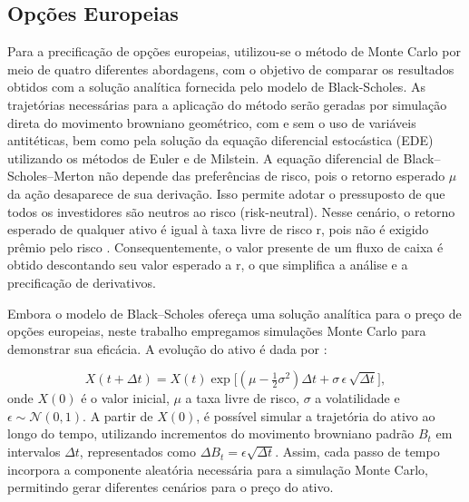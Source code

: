 \documentclass[12pt,openright,oneside,a4paper]{abntex2}
\numberwithin{equation}{section}
\begin{document}

\subsection{Opções Europeias}

Para a precificação de opções europeias, utilizou-se o método de Monte Carlo por meio de quatro diferentes abordagens, com o objetivo de comparar os resultados obtidos com a solução analítica fornecida pelo modelo de Black-Scholes. As trajetórias necessárias para a aplicação do método serão geradas por simulação direta do movimento browniano geométrico, com e sem o uso de variáveis antitéticas, bem como pela solução da equação diferencial estocástica (EDE) utilizando os métodos de Euler e de Milstein. A equação diferencial de Black--Scholes--Merton não depende das preferências de risco, pois o retorno esperado $\mu$ da ação desaparece de sua derivação. Isso permite adotar o pressuposto de que todos os investidores são neutros ao risco (risk-neutral). Nesse cenário, o retorno esperado de qualquer ativo é igual à taxa livre de risco r, pois não é exigido prêmio pelo risco \textcite[p.~357]{Hull}. Consequentemente, o valor presente de um fluxo de caixa é obtido descontando seu valor esperado a r, o que simplifica a análise e a precificação de derivativos.

Embora o modelo de Black--Scholes ofereça uma solução analítica para o preço de opções europeias, neste trabalho empregamos simulações Monte Carlo para demonstrar sua eficácia. A evolução do ativo é dada por \textcite[p.~508]{Hull}:

\begin{equation}
X(t + \Delta t) = X(t) \exp \Big[ (\mu - \tfrac{1}{2}\sigma^2) \Delta t + \sigma \, \epsilon \, \sqrt{\Delta t} \Big],
\end{equation}
onde $X(0)$ é o valor inicial, $\mu$ a taxa livre de risco, $\sigma$ a volatilidade e $\epsilon \sim \mathcal{N}(0,1)$. A partir de $X(0)$, é possível simular a trajetória do ativo ao longo do tempo, utilizando incrementos do movimento browniano padrão $B_t$ em intervalos $\Delta t$, representados como $\Delta B_t = \epsilon \sqrt{\Delta t}$. Assim, cada passo de tempo incorpora a componente aleatória necessária para a simulação Monte Carlo, permitindo gerar diferentes cenários para o preço do ativo.
\end{document}

